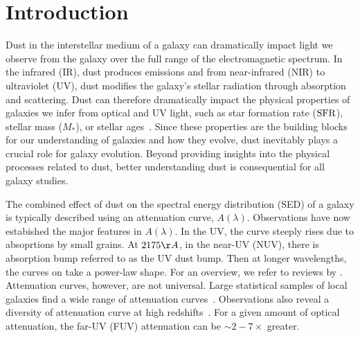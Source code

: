 \section{Introduction} \label{sec:intro} 
Dust in the interstellar medium of a galaxy can dramatically impact light we
observe from the galaxy over the full range of the electromagnetic spectrum. 
In the infrared (IR), dust produces emissions and from near-infrared (NIR) to
ultraviolet (UV), dust modifies the galaxy's stellar radiation through
absorption and scattering. Dust can therefore dramatically impact the physical
properties of galaxies we infer from optical and UV light, such as star
formation rate (${\rm SFR}$), stellar mass ($M_*$), or stellar ages~\citep[see
reviews by][]{walcher2011, conroy2013}. Since these properties are the
building blocks for our understanding of galaxies and how they evolve, dust
inevitably plays a crucial role for galaxy evolution. Beyond providing insights
into the physical processes related to dust, better understanding dust is
consequential for all galaxy studies.

The combined effect of dust on the spectral energy distribution (SED) of a
galaxy is typically described using an attenuation curve, $A(\lambda)$.
Observations have now estabished the major features in $A(\lambda)$. In the UV, the 
curve steeply rises due to absoprtions by small grains. At $2175\AA$, in the 
near-UV (NUV), there is absorption bump referred to as the UV dust bump. Then 
at longer wavelengths, the curves on take a power-law shape. For an overview, we 
refer to reviews by \cite{calzetti2001, draine2003, galliano2018}. Attenuation
curves, however, are not universal. Large statistical samples of local galaxies
find a wide range of attenuation curves~\citep{wild2011, battisti2017,
salim2018, salim2020}. Observations also reveal a diversity of attenuation
curve at high redshifts~\citep[\eg][]{reddy2015, salmon2016}. For a given
amount of optical attenuation, the far-UV (FUV) attenuation can be $\sim
2-7\times$ greater. 

